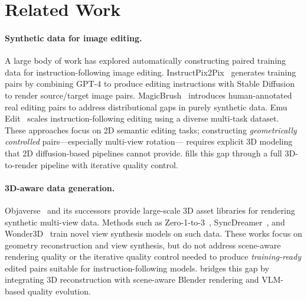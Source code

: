 \section{Related Work}
\label{sec:related}

\paragraph{Synthetic data for image editing.}
A large body of work has explored automatically constructing paired training data
for instruction-following image editing.
InstructPix2Pix~\cite{PLACEHOLDER_brooks2023instructpix2pix_verify}
generates training pairs by combining GPT-4 \cite{PLACEHOLDER_gpt4_verify}
to produce editing instructions with Stable Diffusion~\cite{PLACEHOLDER_rombach2022latentdiffusion_verify}
to render source/target image pairs.
MagicBrush~\cite{PLACEHOLDER_zhang2024magicbrush_verify} introduces human-annotated
real editing pairs to address distributional gaps in purely synthetic data.
Emu Edit~\cite{PLACEHOLDER_sheynin2024emuedit_verify} scales instruction-following editing
using a diverse multi-task dataset.
These approaches focus on 2D semantic editing tasks;
constructing \emph{geometrically controlled} pairs---especially multi-view rotation---
requires explicit 3D modeling that 2D diffusion-based pipelines cannot provide.
\aris{} fills this gap through a full 3D-to-render pipeline with iterative quality control.

\paragraph{3D-aware data generation.}
Objaverse~\cite{PLACEHOLDER_deitke2023objaverse_verify} and its successors provide
large-scale 3D asset libraries for rendering synthetic multi-view data.
Methods such as Zero-1-to-3~\cite{PLACEHOLDER_liu2023zero123_verify},
SyncDreamer~\cite{PLACEHOLDER_liu2023syncdreamer_verify},
and Wonder3D~\cite{PLACEHOLDER_long2024wonder3d_verify}
train novel view synthesis models on such data.
These works focus on geometry reconstruction and view synthesis,
but do not address scene-aware rendering quality or the iterative quality control
needed to produce \emph{training-ready} edited pairs suitable for instruction-following models.
\aris{} bridges this gap by integrating 3D reconstruction with scene-aware Blender rendering
and VLM-based quality evolution.

